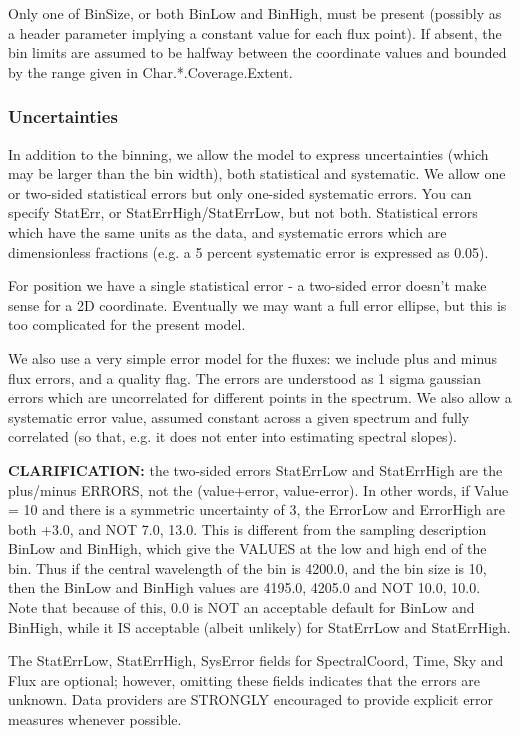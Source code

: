 \documentclass[11pt]{article}
\begin{document}
Only one of BinSize, or both
BinLow and BinHigh, must be present  (possibly as a header parameter
implying a constant value for each flux point). 
If absent, the bin limits are assumed to be halfway between the
coordinate values and bounded by the range given in Char.*.Coverage.Extent.

\subsubsection{Uncertainties}

In addition to the binning, we allow the model to express uncertainties
(which may be larger than the bin width), both statistical and systematic.
We allow one or two-sided statistical errors but only one-sided systematic errors.
You can specify StatErr, or StatErrHigh/StatErrLow, but not both.
Statistical errors which have the same units as
the data, and systematic errors which are dimensionless fractions
(e.g. a 5 percent systematic error is expressed as 0.05).


For position we have a single statistical error - a two-sided error
doesn't make sense for a 2D coordinate. Eventually we may want a full
error ellipse, but this is too complicated for the present model.
  
We also use a very simple error model for the fluxes: we include plus and minus flux
errors, and a quality flag. The errors are understood as
1 sigma gaussian errors which are uncorrelated for different points
in the spectrum. 
We also allow a systematic error value, assumed constant across
a given spectrum and fully correlated (so that, e.g. it does not enter
into estimating spectral slopes).

{\bf CLARIFICATION: }  the two-sided errors StatErrLow and StatErrHigh are the plus/minus ERRORS,
not the (value+error, value-error). In other words, if Value = 10 and there
is a symmetric uncertainty of 3, the ErrorLow and ErrorHigh are both +3.0,
and NOT 7.0, 13.0. This is different from the sampling description BinLow
and BinHigh, which give the VALUES at the low and high end of the bin. Thus
if the central wavelength of the bin is 4200.0, and the bin size is 10, then
the BinLow and BinHigh values are 4195.0, 4205.0 and NOT 10.0, 10.0. Note that
because of this, 0.0 is NOT an acceptable default for BinLow and BinHigh, while
it IS acceptable (albeit unlikely) for StatErrLow and StatErrHigh.
  
The StatErrLow, StatErrHigh, SysError fields for
SpectralCoord, Time, Sky and Flux are optional; however, omitting these fields
indicates that the errors are unknown. Data providers are STRONGLY
encouraged to provide explicit error measures whenever possible. 
\end{document}
